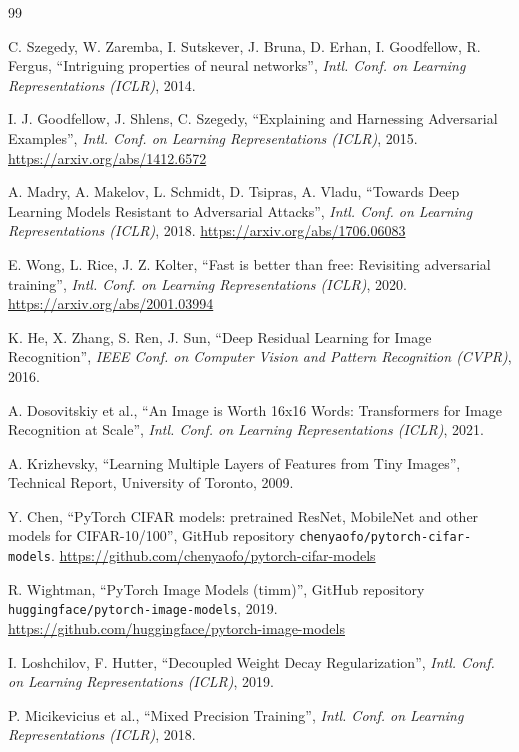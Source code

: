 \documentclass[twoside,a4paper,11pt]{article}
\begin{document}
\begin{thebibliography}{99}

C. Szegedy, W. Zaremba, I. Sutskever, J. Bruna, D. Erhan, I. Goodfellow,
R. Fergus, ``Intriguing properties of neural networks'',
{\em Intl. Conf. on Learning Representations (ICLR)}, 2014.

I. J. Goodfellow, J. Shlens, C. Szegedy, ``Explaining and Harnessing
Adversarial Examples'', {\em Intl. Conf. on Learning Representations
(ICLR)}, 2015. \url{https://arxiv.org/abs/1412.6572}

A. Madry, A. Makelov, L. Schmidt, D. Tsipras, A. Vladu, ``Towards Deep
Learning Models Resistant to Adversarial Attacks'', {\em Intl. Conf. on
Learning Representations (ICLR)}, 2018. \url{https://arxiv.org/abs/1706.06083}

E. Wong, L. Rice, J. Z. Kolter, ``Fast is better than free: Revisiting
adversarial training'', {\em Intl. Conf. on Learning Representations
(ICLR)}, 2020. \url{https://arxiv.org/abs/2001.03994}

K. He, X. Zhang, S. Ren, J. Sun, ``Deep Residual Learning for Image
Recognition'', {\em IEEE Conf. on Computer Vision and Pattern Recognition
(CVPR)}, 2016.

A. Dosovitskiy et al., ``An Image is Worth 16x16 Words: Transformers for
Image Recognition at Scale'', {\em Intl. Conf. on Learning Representations
(ICLR)}, 2021.

A. Krizhevsky, ``Learning Multiple Layers of Features from Tiny Images'',
Technical Report, University of Toronto, 2009.

Y. Chen, ``PyTorch CIFAR models: pretrained ResNet, MobileNet and other
models for CIFAR-10/100'', GitHub repository
\texttt{chenyaofo/pytorch-cifar-models}.
\url{https://github.com/chenyaofo/pytorch-cifar-models}

R. Wightman, ``PyTorch Image Models (timm)'', GitHub repository
\texttt{huggingface/pytorch-image-models}, 2019.
\url{https://github.com/huggingface/pytorch-image-models}

I. Loshchilov, F. Hutter, ``Decoupled Weight Decay Regularization'',
{\em Intl. Conf. on Learning Representations (ICLR)}, 2019.

P. Micikevicius et al., ``Mixed Precision Training'', {\em Intl. Conf. on
Learning Representations (ICLR)}, 2018.


\end{thebibliography}
\end{document}
